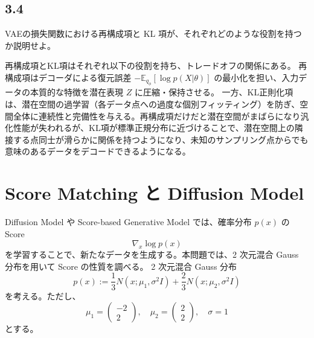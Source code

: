 \documentclass[11pt,a4paper,dvipdfmx]{article}
\numberwithin{equation}{section}
\newenvironment{proofbox}[0]
{
    \begin{mdframed}[
        linecolor=black,
        topline=false,
        bottomline=false,
        rightline=false,
        leftline=true,
        linewidth=2pt,
        innerleftmargin=10pt,
        skipabove=\baselineskip,
        skipbelow=\baselineskip,
    ]
}
{
    \end{mdframed}
}
\newenvironment{note}[0]
{
    \begin{tcolorbox}[sharp corners, colframe=gray!20, colback=gray!20, width=\textwidth]
}
{
    \end{tcolorbox}
}
\begin{document}
\subsection*{3.4}
\begin{note}
VAEの損失関数における再構成項と KL 項が、それぞれどのような役割を持つか説明せよ。
\end{note}
\begin{proofbox}
再構成項とKL項はそれぞれ以下の役割を持ち、トレードオフの関係にある。
再構成項はデコーダによる復元誤差 $-\mathbb{E}_{q_\phi} [\log p(X|\theta)]$ の最小化を担い、入力データの本質的な特徴を潜在表現 $Z$ に圧縮・保持させる。
一方、KL正則化項は、潜在空間の過学習（各データ点への過度な個別フィッティング）を防ぎ、空間全体に連続性と完備性を与える。再構成項だけだと潜在空間がまばらになり汎化性能が失われるが、KL項が標準正規分布に近づけることで、潜在空間上の隣接する点同士が滑らかに関係を持つようになり、未知のサンプリング点からでも意味のあるデータをデコードできるようになる。
\end{proofbox}

\section{Score Matching と Diffusion Model}
\begin{note}
Diffusion Model や Score-based Generative Model では、確率分布 $p(x)$ の Score
\[ \nabla_x \log p(x) \]
を学習することで、新たなデータを生成する。本問題では、2 次元混合 Gauss 分布を用いて Score の性質を調べる。
2 次元混合 Gauss 分布
\[ p(x) := \frac{1}{3} N (x; \mu_1, \sigma^2 I) + \frac{2}{3} N (x; \mu_2, \sigma^2 I) \]
を考える。ただし、
\[ \mu_1 = \begin{pmatrix} -2 \\ 2 \end{pmatrix}, \quad \mu_2 = \begin{pmatrix} 2 \\ 2 \end{pmatrix}, \quad \sigma = 1 \]
とする。
\end{note}
\end{document}
